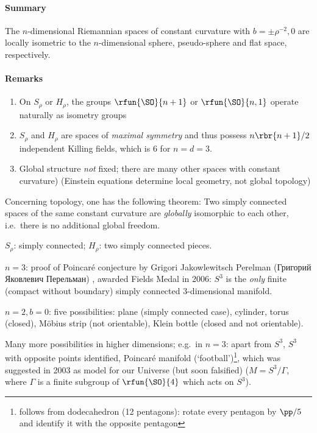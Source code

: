 \paragraph{Summary} The $n$-dimensional Riemannian spaces of constant curvature 
with $b = \pm\rho^{-2}, 0$ are locally isometric to the $n$-dimensional sphere, 
pseudo-sphere and flat space, respectively.

\paragraph{Remarks}
\begin{enumerate}
\item On $S_\rho$ or $H_\rho$, the groups $\rfun{\SO}{n+1}$ or 
$\rfun{\SO}{n,1}$ operate naturally as isometry groups
\item $S_\rho$ and $H_\rho$ are spaces of \emph{maximal symmetry} and thus 
possess $n\rbr{n+1}/2$ independent Killing fields, which is $6$ for $n = d = 3$.
\item Global structure \emph{not} fixed; there are many other spaces with 
constant curvature) (Einstein equations determine local geometry, not global 
topology)
\end{enumerate}

Concerning topology, one has the following theorem: Two simply connected spaces 
of the same constant curvature are \emph{globally} isomorphic to each other, 
i.e.\ there is no additional global freedom.

$S_\rho$: simply connected; $H_\rho$: two simply connected pieces.

$n=3$: proof of Poincaré conjecture by Grigori Jakowlewitsch Perelman
(Григорий Яковлевич Перельман) \cite{math/0211159,math/0303109,math/0307245}, 
awarded Fields Medal in 2006: $S^3$ is the \emph{only} finite (compact without 
boundary) simply connected $3$-dimensional manifold.

$n=2, b=0$: five possibilities: plane (simply connected case), cylinder, torus 
(closed), Möbius strip (not orientable), Klein bottle (closed and not 
orientable).

Many more possibilities in higher dimensions; e.g.\ in $n=3$: apart from $S^3$, 
$S^3$ with opposite points identified, Poincaré manifold 
(`football')\footnote{follows from dodecahedron (12 pentagons): rotate every 
pentagon by $\pp/5$ and identify it with the opposite pentagon}, which was 
suggested in 2003 as model for our Universe (but soon falsified) ($M = 
S^3/\Gamma$, where $\Gamma$ is a finite subgroup of $\rfun{\SO}{4}$ which 
acts on $S^3$).

